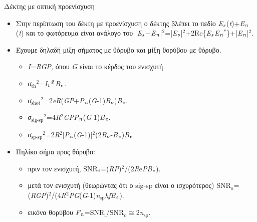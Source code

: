 \documentclass[11pt,aspectratio=169]{beamer}
\begin{document}
\begin{frame}[shrink=20,t]{Δέκτης με οπτική προενίσχυση}
\begin{itemize}
\item Στην περίπτωση του δέκτη με προενίσχυση ο δέκτης βλέπει το πεδίο \textit{Ε}$_{\text{\textit{s}}}$(\textit{t})+\textit{E}$_{\text{\textit{n}}}$(\textit{t}) και το φωτόρευμα είναι ανάλογο του |\textit{Ε}$_{\text{\textit{s}}}$+\textit{E}$_{\text{\textit{n}}}$|$^{\text{2}}$=|\textit{E}$_{\text{\textit{s}}}$|$^{\text{2}}$+2Re\{\textit{E}$_{\text{\textit{s}}}$\textit{E}$_{\text{\textit{n}}}$$^{\text{*}}$\}+|\textit{Ε}$_{\text{\textit{n}}}$|$^{\text{2}}$.
\item Έχουμε δηλαδή μίξη σήματος με θόρυβο και μίξη θορύβου με θόρυβο.
\begin{itemize}
\item \textit{Ι}=\textit{RGP}, όπου \textit{G} είναι το κέρδος του ενισχυτή.
\item \textit{σ}$_{\text{th}}$$^{\text{2}}$\textit{=I}$_{\text{\textit{t}}}$$^{\text{\textit{2}}}$\textit{B}$_{\text{\textit{e}}}$\textit{.}
\item \textit{σ}$_{\text{shot}}$$^{\text{2}}$=2\textit{eR}(\textit{GP}+\textit{P}$_{\text{\textit{n}}}$(\textit{G}-1)\textit{B}$_{\text{\textit{o}}}$)\textit{B}$_{\text{\textit{e}}}$.
\item \textit{σ}$_{\text{sig-sp}}$$^{\text{2}}$=4\textit{R}$^{\text{2}}$\textit{GPP}$_{\text{\textit{n}}}$(\textit{G}-1)\textit{B}$_{\text{\textit{e}}}$.
\item \textit{σ}$_{\text{sp-sp}}$$^{\text{2}}$=2\textit{R}$^{\text{2}}$[\textit{P}$_{\text{\textit{n}}}$(\textit{G}-1)]$^{\text{2}}$(2\textit{B}$_{\text{\textit{o}}}$-\textit{B}$_{\text{\textit{e}}}$)\textit{B}$_{\text{\textit{e}}}$.
\end{itemize}
\item Πηλίκο σήμα προς θόρυβο:
\begin{itemize}
\item πριν τον ενισχυτή, SNR$_{\text{\textit{i}}}$=(\textit{RP})$^{\text{2}}$/(2\textit{R}e\textit{PB}$_{\text{\textit{e}}}$).
\item μετά τον ενισχυτή (θεωρώντας ότι ο sig-sp είναι ο ισχυρότερος) SNR$_{\text{o}}$=(\textit{RGP})$^{\text{2}}$/(4\textit{R}$^{\text{2}}$\textit{PG}(\textit{G}-1)\textit{n}$_{\text{sp}}$\textit{hfB}$_{\text{\textit{e}}}$).
\item εικόνα θορύβου \textit{F}$_{\text{\textit{n}}}$=SNR$_{\text{i}}$/SNR$_{\text{o}}$\ensuremath{\cong}2\textit{n}$_{\text{sp}}$.
\end{itemize}
\end{itemize}
\end{frame}
\end{document}
